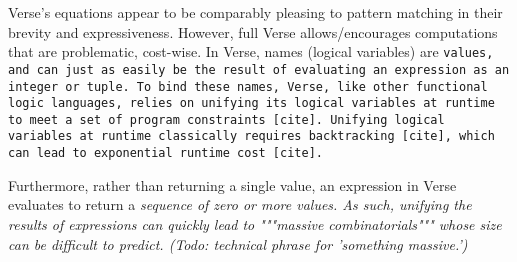 \documentclass[manuscript,screen,review, 12pt]{acmart}
\begin{document}







    

    
    

    Verse's equations appear to be comparably pleasing to pattern matching
    in their brevity and expressiveness. However, full Verse allows/encourages
    computations that are problematic, cost-wise. In Verse, names (logical
    variables) are \tt{values}, and can just as easily be the result of
    evaluating an expression as an integer or tuple. To bind these names, Verse,
    like other functional logic languages, relies on unifying its logical
    variables at runtime to meet a set of program constraints [cite]. Unifying
    logical variables at runtime classically requires backtracking [cite], which
    can lead to exponential runtime cost [cite]. 
        
    Furthermore, rather than returning a single value, an expression in Verse
    evaluates to return a \it{sequence} of zero or more values. As such,
    unifying the results of expressions can quickly lead to """massive
    combinatorials""" whose size can be difficult to predict. (Todo: technical phrase for 'something massive.') 
\end{document}
